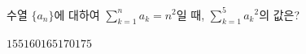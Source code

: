 수열 $\{a_n\}$에 대하여 $\displaystyle\sum_{k=1}^{n}a_k=n^2$일 때, $\displaystyle\sum_{k=1}^{5}a_k{}^2$의 값은?
\begin{choices32}{$155$}{$160$}{$165$}{$170$}{$175$}\end{choices32}
